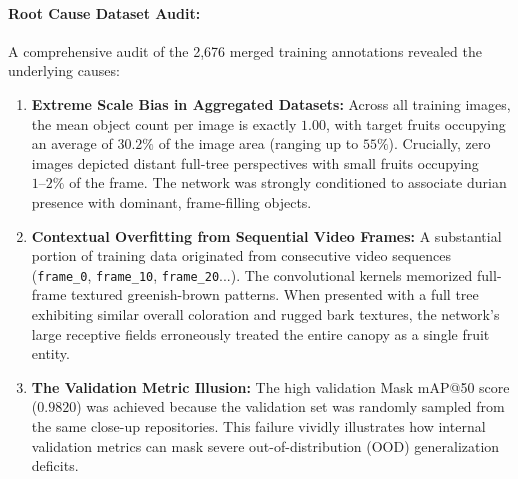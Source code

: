 \documentclass[12pt,a4paper]{article}
\begin{document}
\paragraph{Root Cause Dataset Audit:}
A comprehensive audit of the 2,676 merged training annotations revealed the underlying causes:
\begin{enumerate}
    \item \textbf{Extreme Scale Bias in Aggregated Datasets:} Across all training images, the mean object count per image is exactly $1.00$, with target fruits occupying an average of $30.2\%$ of the image area (ranging up to $55\%$). Crucially, zero images depicted distant full-tree perspectives with small fruits occupying $1\text{--}2\%$ of the frame. The network was strongly conditioned to associate durian presence with dominant, frame-filling objects.
    \item \textbf{Contextual Overfitting from Sequential Video Frames:} A substantial portion of training data originated from consecutive video sequences (\texttt{frame\_0}, \texttt{frame\_10}, \texttt{frame\_20}...). The convolutional kernels memorized full-frame textured greenish-brown patterns. When presented with a full tree exhibiting similar overall coloration and rugged bark textures, the network's large receptive fields erroneously treated the entire canopy as a single fruit entity.
    \item \textbf{The Validation Metric Illusion:} The high validation Mask mAP@50 score ($0.9820$) was achieved because the validation set was randomly sampled from the same close-up repositories. This failure vividly illustrates how internal validation metrics can mask severe out-of-distribution (OOD) generalization deficits.
\end{enumerate}
\end{document}
